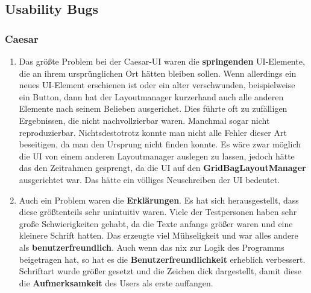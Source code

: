 \documentclass{article}
\begin{document}
  \subsection{Usability Bugs}
    \subsubsection{Caesar}
     \begin{enumerate}
      \item Das größte Problem bei der Caesar-UI waren die \textbf{springenden} UI-Elemente, die an ihrem ursprünglichen Ort hätten bleiben sollen.
            Wenn allerdings ein neues UI-Element erschienen ist oder ein alter verschwunden, beispielweise ein Button, dann hat der Layoutmanager kurzerhand auch alle anderen
            Elemente nach seinem Belieben ausgerichet. Dies führte oft zu zufälligen Ergebnissen, die nicht nachvollzierbar waren. Manchmal sogar nicht reproduzierbar.
            Nichtsdestotrotz konnte man nicht alle Fehler dieser Art beseitigen, da man den Ursprung nicht finden konnte.\newline 
            Es wäre zwar möglich die UI von einem anderen Layoutmanager auslegen zu lassen, jedoch hätte das den Zeitrahmen gesprengt, da die UI
            auf den \textbf{GridBagLayoutManager} ausgerichtet war. Das hätte ein völliges Neuschreiben der UI bedeutet. 
            
      \item Auch ein Problem waren die \textbf{Erklärungen}. Es hat sich herausgestellt, dass diese größtenteils sehr {unintuitiv} waren.
            Viele der Testpersonen haben sehr große Schwierigkeiten gehabt, da die Texte anfangs größer waren und eine kleinere Schrift hatten.
            Das erzeugte viel Mühseligkeit und war alles andere als \textbf{benutzerfreundlich}.\newline
            Auch wenn das nix zur Logik des Programms beigetragen hat, so hat es die \textbf{Benutzerfreundlichkeit} erheblich verbessert. 
            Schriftart wurde größer gesetzt und die Zeichen dick dargestellt, damit diese die \textbf{Aufmerksamkeit} des Users als erste auffangen.
            

\end{enumerate}
\end{document}
